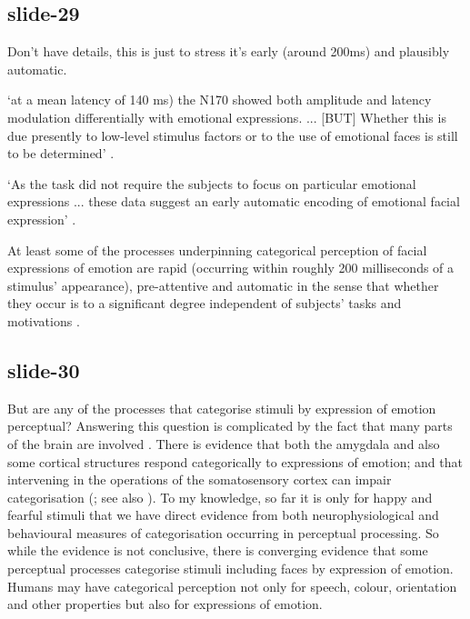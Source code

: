 \documentclass[12pt,\papersize]{extarticle}
\begin{document}
\subsection{slide-29}
Don't have details, this is just to stress it's early (around 200ms) and plausibly automatic.

‘at a mean latency of 140 ms) the N170 showed both amplitude and latency
modulation differentially with emotional expressions. ...
[BUT] Whether this is due presently to low-level stimulus factors or to the use of emotional faces
is still to be determined’ \citep[p.~616]{batty:2003_early}.

‘As the task did not require the subjects to focus on particular emotional expressions ...
these data suggest an early automatic encoding of emotional facial expression’ \citep[p.~616]{batty:2003_early}.

At least some of the processes underpinning categorical perception of facial expressions
of emotion are rapid (occurring within roughly 200 milliseconds of a stimulus' appearance),
pre-attentive \citep{vuilleumier:2001_emotional} and automatic in the sense that whether they occur
is to a significant degree independent of subjects' tasks and motivations \citep{batty:2003_early}.%

\subsection{slide-30}
But are any of the processes that categorise stimuli by expression of emotion perceptual?
Answering this question is complicated by the fact that many parts of the brain are involved \citep{adolphs:2002_recognizing,vuilleumier:2007_distributed}.
There is evidence that both the amygdala \citep{harris:2012_morphing,harris:2014_dynamic} and also some cortical structures \citep{batty:2003_early}
respond categorically to  expressions of emotion;
and that intervening in the operations of the somatosensory cortex can impair categorisation (\citealp{pitcher:2008_transcranial}; see also \citealp{banissy:2011_superior}).
To my knowledge, so far it is only for happy and fearful stimuli that we have direct evidence
from both neurophysiological \citep{Campanella:2002aa} and behavioural measures \citep{williams:2005_looka}
of categorisation occurring in perceptual processing.
So while the evidence is not conclusive,
there is converging evidence that some perceptual processes categorise stimuli including faces by  expression of emotion.
Humans may have categorical perception not only for speech, colour, orientation and other properties but also for expressions of emotion.
\end{document}
